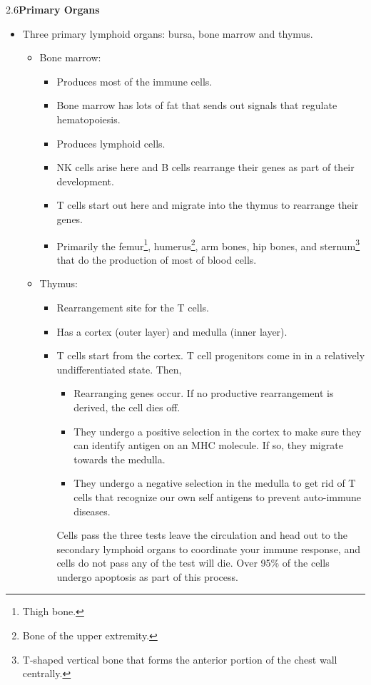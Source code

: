 \documentclass[UTF8]{book}
\begin{document}
2.6\quad \textbf{Primary Organs}
\begin{itemize}
\item Three primary lymphoid organs: bursa, bone marrow and thymus.
\begin{itemize}
\item Bone marrow:
\begin{itemize}
	\item Produces most of the immune cells.
	\item Bone marrow has lots of fat that sends out signals that regulate hematopoiesis.
	\item Produces lymphoid cells.
	\item NK cells arise here and B cells rearrange their genes as part of their development.
	\item T cells start out here and migrate into the thymus to rearrange their genes.
	\item Primarily the femur\footnote{Thigh bone.}, humerus\footnote{Bone of the upper extremity.}, arm bones, hip bones, and sternum\footnote{T-shaped vertical bone that forms the anterior portion of the chest wall centrally.} that do the production of most of blood cells.
\end{itemize}
\item Thymus:
\begin{itemize}
	\item Rearrangement site for the T cells.
	\item Has a cortex (outer layer) and medulla (inner layer). 
	\item T cells start from the cortex. T cell progenitors come in in a relatively undifferentiated state. Then,
	\begin{itemize}
	    \item Rearranging genes occur. If no productive rearrangement is derived, the cell dies off.
		\item They undergo a positive selection in the cortex to make sure they can identify antigen on an MHC molecule. If so, they migrate towards the medulla.
		\item They undergo a negative selection in the medulla to get rid of T cells that recognize our own self antigens to prevent auto-immune diseases. 
	\end{itemize}
	Cells pass the three tests leave the circulation and head out to the secondary lymphoid organs to coordinate your immune response, and cells do not pass any of the test will die. Over 95\% of the cells undergo apoptosis as part of this process.
\end{itemize}
\end{itemize} 
\end{itemize}
\end{document}
